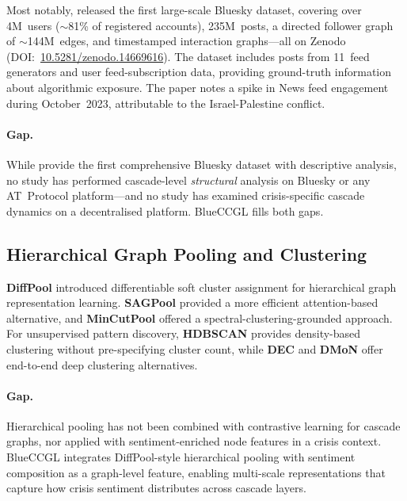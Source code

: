 \documentclass[12pt,a4paper]{article}
\begin{document}
Most notably, \citet{failla2024bluesky} released the first large-scale Bluesky
dataset, covering over 4M~users ($\sim$81\% of registered accounts), 235M~posts,
a directed follower graph of $\sim$144M~edges, and timestamped interaction
graphs---all on Zenodo
(DOI:~\href{https://doi.org/10.5281/zenodo.14669616}{10.5281/zenodo.14669616}).
The dataset includes posts from 11~feed generators and user feed-subscription
data, providing ground-truth information about algorithmic exposure.  The paper
notes a spike in News feed engagement during October~2023, attributable to the
Israel-Palestine conflict.

\paragraph{Gap.}
While \citet{failla2024bluesky} provide the first comprehensive Bluesky dataset
with descriptive analysis, no study has performed cascade-level \emph{structural}
analysis on Bluesky or any AT~Protocol platform---and no study has examined
crisis-specific cascade dynamics on a decentralised platform.  BlueCCGL fills
both gaps.

\subsection{Hierarchical Graph Pooling and Clustering}

\textbf{DiffPool} \citep{ying2018diffpool} introduced differentiable soft
cluster assignment for hierarchical graph representation learning.
\textbf{SAGPool} \citep{lee2019sagpool} provided a more efficient
attention-based alternative, and \textbf{MinCutPool}
\citep{bianchi2020mincutpool} offered a spectral-clustering-grounded approach.
For unsupervised pattern discovery, \textbf{HDBSCAN} \citep{mcinnes2017hdbscan}
provides density-based clustering without pre-specifying cluster count, while
\textbf{DEC} \citep{xie2016dec} and \textbf{DMoN} \citep{tsitsulin2023dmon}
offer end-to-end deep clustering alternatives.

\paragraph{Gap.}
Hierarchical pooling has not been combined with contrastive learning for cascade
graphs, nor applied with sentiment-enriched node features in a crisis context.
BlueCCGL integrates DiffPool-style hierarchical pooling with sentiment
composition as a graph-level feature, enabling multi-scale representations that
capture how crisis sentiment distributes across cascade layers.
\end{document}
